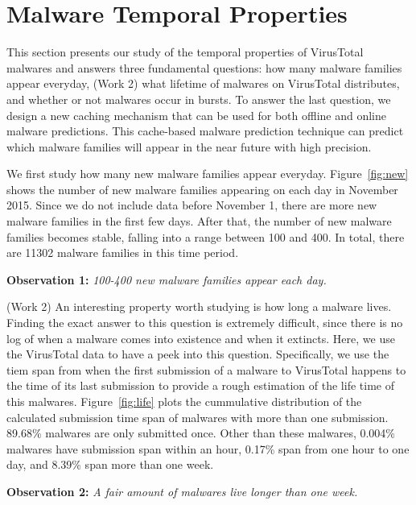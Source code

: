 \section{Malware Temporal Properties}
\label{sec:temporal}

This section presents our study of the temporal properties of VirusTotal malwares
and answers three fundamental questions: 
how many malware families appear everyday, 
{\color{red} (Work 2)
what lifetime of malwares on VirusTotal distributes,  
}
and whether or not malwares occur in bursts.
To answer the last question, we design a new caching mechanism 
that can be used for both offline and online malware predictions.
This cache-based malware prediction technique can predict which malware families will appear in the near future with high precision.



We first study how many new malware families appear everyday. 
Figure~\ref{fig:new} shows the number of new malware families appearing on each day in November 2015. 
Since we do not include data before November 1, 
there are more new malware families in the first few days.
After that, the number of new malware families becomes stable, 
falling into a range between 100 and 400. 
In total, there are 11302 malware families in this time period. 

{\bf Observation 1:} 
{\em 100-400 new malware families appear each day.}

%
%


{\color{red} (Work 2)
An interesting property worth studying is how long a malware lives. 
Finding the exact answer to this question is extremely difficult, since there 
is no log of when a malware comes into existence and when it extincts.
Here, we use the VirusTotal data to have a peek into this question.
Specifically, we use the tiem span from when the first submission of a malware to VirusTotal happens
to the time of its last submission
to provide a rough estimation of the life time of this malwares.
Figure~\ref{fig:life} plots the cummulative distribution of the calculated submission time span of malwares with more than one submission.
89.68\% malwares are only submitted once.
Other than these malwares, 0.004\% malwares have submission span within an hour, 
0.17\% span from one hour to one day, and 8.39\% span more than one week.


{\bf Observation 2:}
{\em A fair amount of malwares live longer than one week.} %

}


